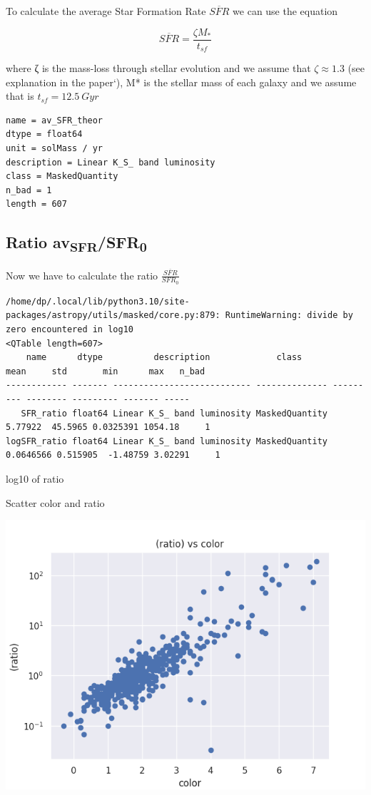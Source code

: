 \documentclass[a4paper]{article}
\begin{document}
To calculate the average Star Formation Rate \(\overline{SFR}\) we can use the equation

$$
    \overline{SFR}=\frac{\zeta M_*}{t_{sf}}
$$

where ζ is the mass-loss through stellar evolution and we assume that \(\zeta\approx 1.3\) (see explanation in the paper`), M* is the stellar mass of each galaxy and we assume that is   \(t_{sf}=12.5\ Gyr\)

\begin{verbatim}
name = av_SFR_theor
dtype = float64
unit = solMass / yr
description = Linear K_S_ band luminosity
class = MaskedQuantity
n_bad = 1
length = 607
\end{verbatim}


\subsection{Ratio av\textsubscript{SFR}/SFR\textsubscript{0}}
\label{sec:org01c7dc6}


Now we have to calculate the ratio \(\frac{\overline{SFR}}{SFR_0}\)

\begin{verbatim}
/home/dp/.local/lib/python3.10/site-packages/astropy/utils/masked/core.py:879: RuntimeWarning: divide by zero encountered in log10
<QTable length=607>
    name      dtype          description             class         mean     std       min      max   n_bad
------------ ------- --------------------------- -------------- --------- -------- --------- ------- -----
   SFR_ratio float64 Linear K_S_ band luminosity MaskedQuantity   5.77922  45.5965 0.0325391 1054.18     1
logSFR_ratio float64 Linear K_S_ band luminosity MaskedQuantity 0.0646566 0.515905  -1.48759 3.02291     1
\end{verbatim}


log10 of ratio

Scatter color and ratio

\begin{center}
\includegraphics[width=.9\linewidth]{figure/ratio_vs_color.png}
\end{center}
\end{document}
